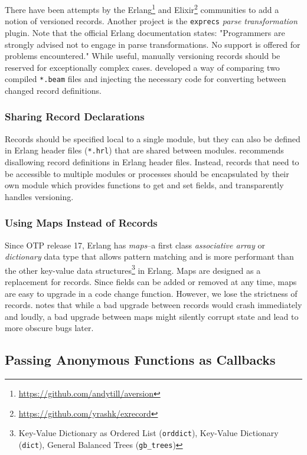 There have been attempts by the Erlang\footnote{\url{https://github.com/andytill/aversion}} and Elixir\footnote{\url{https://github.com/yrashk/exrecord}} communities to add a notion of versioned records. Another project is the \lstinline|exprecs| \emph{parse transformation} plugin. Note that the official Erlang documentation states: "Programmers are strongly advised not to engage in parse transformations. No support is offered for problems encountered." While useful, manually versioning records should be reserved for exceptionally complex cases. \cite{rebar3appup} developed a way of comparing two compiled \lstinline|*.beam| files and injecting the necessary code for converting between changed record definitions.

\subsubsection{Sharing Record Declarations}
Records should be specified local to a single module, but they can also be defined in Erlang header files (\lstinline|*.hrl|) that are shared between modules. \cite{davis:talk} recommends disallowing record definitions in Erlang header files. Instead, records that need to be accessible to multiple modules or processes should be encapsulated by their own module which provides functions to get and set fields, and transparently handles versioning.

\subsubsection{Using Maps Instead of Records}
Since OTP release 17, Erlang has \emph{maps}--a first class \emph{associative array} or \emph{dictionary} data type that allows pattern matching and is more performant than the other key-value data structures\footnote{Key-Value Dictionary as Ordered List (\lstinline|orddict|), Key-Value Dictionary (\lstinline|dict|), General Balanced Trees (\lstinline|gb_trees|)} in Erlang. Maps are designed as a replacement for records. Since fields can be added or removed at any time, maps are easy to upgrade in a code change function. However, we lose the strictness of records. \cite{ferd} notes that while a bad upgrade between records would crash immediately and loudly, a bad upgrade between maps might silently corrupt state and lead to more obscure bugs later.


\subsection{Passing Anonymous Functions as Callbacks}

